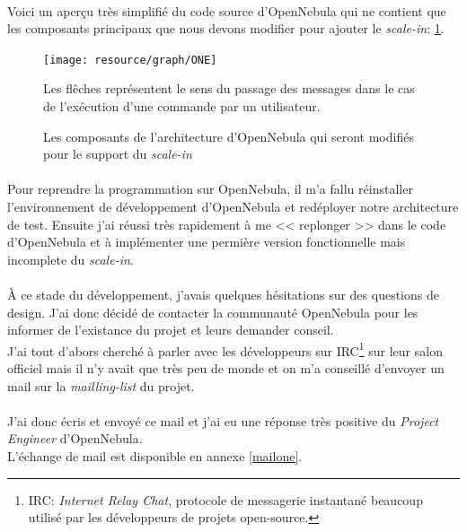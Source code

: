 \paragraph*{}
Voici un aperçu très simplifié du code source d'OpenNebula qui ne contient que les composants principaux que nous devons modifier pour ajouter le \emph{scale-in}: \ref{archionescalein}.

\begin{figure}[H]
\centering
\texttt{[image: resource/graph/ONE]}
\caption{Les composants de l'architecture d'OpenNebula qui seront modifiés pour le support du \emph{scale-in}\\}
Les flêches représentent le sens du passage des messages dans le cas de l'exécution d'une commande par un utilisateur.
\label{archionescalein}
\end{figure}


\paragraph*{}
Pour reprendre la programmation sur OpenNebula, il m'a fallu réinstaller l'environnement de développement d'OpenNebula et redéployer notre architecture de test.
Ensuite j'ai réussi très rapidement à me << replonger >> dans le code d'OpenNebula et à implémenter une permière version fonctionnelle mais incomplete du \emph{scale-in}.

\paragraph*{}
À ce stade du développement, j'avais quelques hésitations sur des questions de design. J'ai donc décidé de contacter la communauté OpenNebula pour les informer de l'existance
du projet et leurs demander conseil.\\
J'ai tout d'abors cherché à parler avec les développeurs sur IRC\footnote{IRC: \emph{Internet Relay Chat}, protocole de messagerie instantané beaucoup utilisé
par les développeurs de projets open-source.} sur leur salon officiel mais il n'y avait que très peu de monde et on m'a conseillé d'envoyer un mail sur la \emph{mailling-list} du
projet.

\paragraph*{}
J'ai donc écris et envoyé ce mail et j'ai eu une réponse très positive du \emph{Project Engineer} d'OpenNebula.\\
L'échange de mail est disponible en annexe \ref{mailone}.



